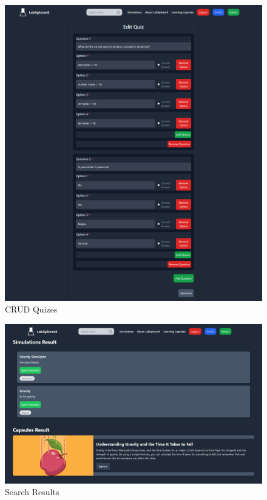  \begin{figure}[H]
    \centering
     \includegraphics[width = 16cm]{Diagrams/output/edit_quiz.png}
     \caption{CRUD Quizes}
 \end{figure}
 \begin{figure}[H]
    \centering
     \includegraphics[width = 16cm]{Diagrams/output/search_results.png}
     \caption{Search Results}
 \end{figure}
